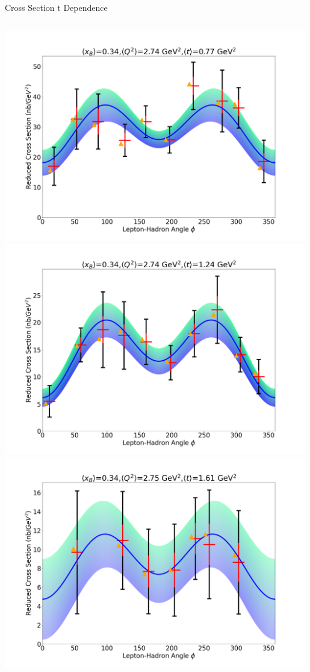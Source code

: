 \documentclass[aspectratio=169]{beamer}
\begin{document}
\begin{frame}{Cross Section t Dependence}
\begin{columns}
            \includegraphics[width=0.99\textwidth]{defense/phi_fitting/xqt_302560.png}
            \includegraphics[width=0.99\textwidth]{defense/phi_fitting/xqt_3025100.png}
            \includegraphics[width=0.99\textwidth]{defense/phi_fitting/xqt_3025150.png}
            

\end{columns}
\end{frame}
\end{document}
